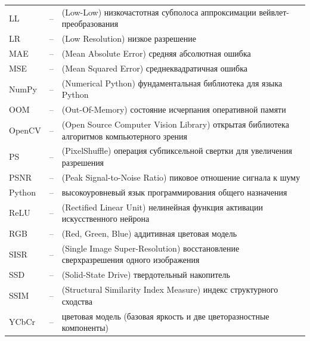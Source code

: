 {\begin{longtable}{@{} p{} @{} c @{\hspace{0.4em}} p{} @{}}
LL & -- & (Low-Low) низкочастотная субполоса аппроксимации вейвлет-преобразования \\
LR & -- & (Low Resolution) низкое разрешение \\
MAE & -- & (Mean Absolute Error) средняя абсолютная ошибка \\
MSE & -- & (Mean Squared Error) среднеквадратичная ошибка \\
NumPy & -- & (Numerical Python) фундаментальная библиотека для языка Python \\
OOM & -- & (Out-Of-Memory) состояние исчерпания оперативной памяти \\
OpenCV & -- & (Open Source Computer Vision Library) открытая библиотека алгоритмов компьютерного зрения \\
PS & -- & (PixelShuffle) операция субпиксельной свертки для увеличения разрешения \\
PSNR & -- & (Peak Signal-to-Noise Ratio) пиковое отношение сигнала к шуму \\
Python & -- & высокоуровневый язык программирования общего назначения \\
ReLU & -- & (Rectified Linear Unit) нелинейная функция активации искусственного нейрона \\
RGB & -- & (Red, Green, Blue) аддитивная цветовая модель \\
SISR & -- & (Single Image Super-Resolution) восстановление сверхразрешения одного изображения \\
SSD & -- & (Solid-State Drive) твердотельный накопитель \\
SSIM & -- & (Structural Similarity Index Measure) индекс структурного сходства \\
YCbCr & -- & цветовая модель (базовая яркость и две цветоразностные компоненты) \\
\end{longtable}
}